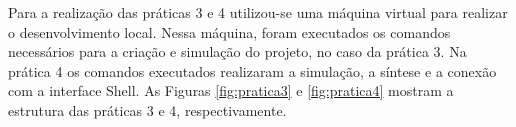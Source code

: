 Para a realização das práticas 3 e 4 utilizou-se uma máquina virtual para realizar o desenvolvimento local. Nessa máquina, foram executados os comandos necessários para a criação e simulação do projeto, no caso da prática 3. Na prática 4 os comandos executados realizaram a simulação, a síntese e a conexão com a interface Shell. As Figuras \ref{fig:pratica3} e \ref{fig:pratica4} mostram a estrutura das práticas 3 e 4, respectivamente.

